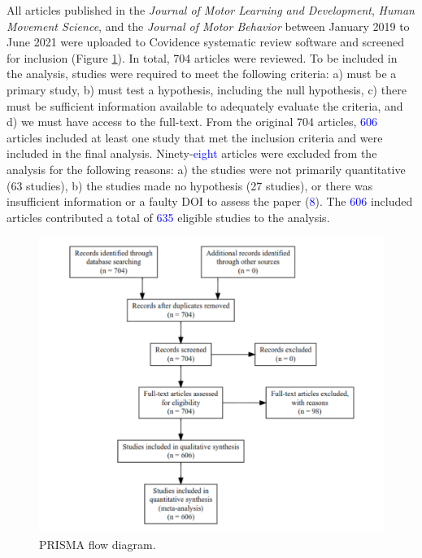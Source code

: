 \documentclass[
  man, donotrepeattitle,mask,floatsintext]{apa7}
\begin{document}
All articles published in the \emph{Journal of Motor Learning and Development}, \emph{Human Movement Science}, and the \emph{Journal of Motor Behavior} between January 2019 to June 2021 were uploaded to Covidence systematic review software and screened for inclusion (Figure \ref{fig:fig1}). In total, 704 articles were reviewed. To be included in the analysis, studies were required to meet the following criteria: a) must be a primary study, b) must test a hypothesis, including the null hypothesis, c) there must be sufficient information available to adequately evaluate the criteria, and d) we must have access to the full-text. From the original 704 articles, \textcolor{blue}{606} articles included at least one study that met the inclusion criteria and were included in the final analysis. Ninety-\textcolor{blue}{eight} articles were excluded from the analysis for the following reasons: a) the studies were not primarily quantitative (63 studies), b) the studies made no hypothesis (27 studies), or there was insufficient information or a faulty DOI to assess the paper (\textcolor{blue}{8}). The \textcolor{blue}{606} included articles contributed a total of \textcolor{blue}{635} eligible studies to the analysis.

\pagebreak

\begin{figure}

{\centering \includegraphics{../../figs/fig1} 

}

\caption{PRISMA flow diagram.}\label{fig:fig1}
\end{figure}
\end{document}
